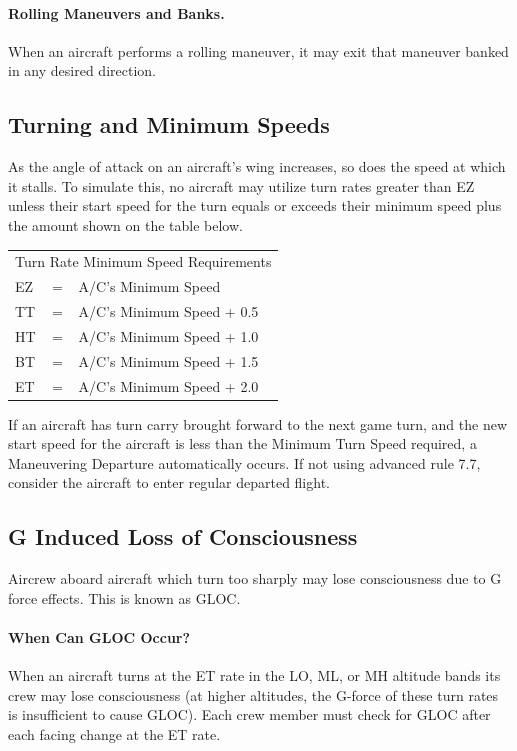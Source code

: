 \paragraph{Rolling Maneuvers and Banks.} When an aircraft performs a rolling maneuver, it may exit that maneuver banked in any desired direction.

\subsection{Turning and Minimum Speeds}

As the angle of attack on an aircraft's wing increases, so does the speed at which it stalls. To simulate this, no aircraft may utilize turn rates greater than EZ unless their start speed for the turn equals or exceeds their minimum speed plus the amount shown on the table below.

\begin{tabular}{lll}
\multicolumn{3}{c}{Turn Rate Minimum Speed Requirements}\\
 EZ &=& A/C's Minimum Speed\\
 TT &=& A/C's Minimum Speed + 0.5\\
 HT &=& A/C's Minimum Speed + 1.0\\
 BT &=& A/C's Minimum Speed + 1.5\\ 
 ET &=& A/C's Minimum Speed + 2.0\\
 \end{tabular}

If an aircraft has turn carry brought forward to the next game turn, and the new start speed for the aircraft is less than the Minimum Turn Speed required, a Maneuvering Departure automatically occurs. If not using advanced rule 7.7, consider the aircraft to enter regular departed flight.

\subsection{G Induced Loss of Consciousness}

Aircrew aboard aircraft which turn too sharply may lose consciousness due to G force effects. This is known as GLOC.

\paragraph{When Can GLOC Occur?} When an aircraft turns at the ET rate in the LO, ML, or MH altitude bands its crew may lose consciousness (at higher altitudes, the G-force of these turn rates is insufficient to cause GLOC). Each crew member must check for GLOC after each facing change at the ET rate.

